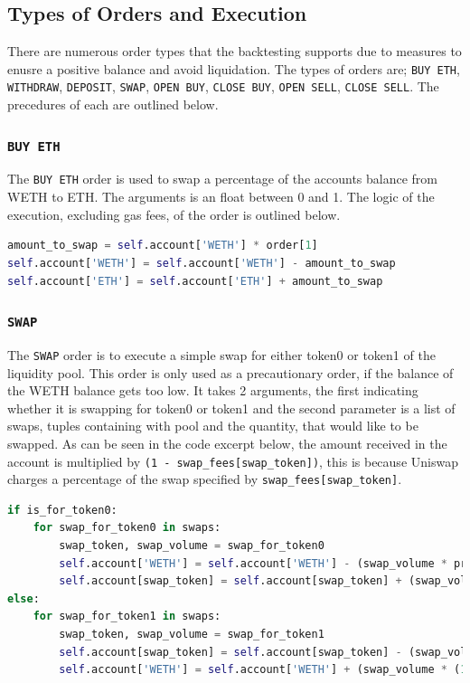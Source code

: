 \subsection{Types of Orders and Execution}
There are numerous order types that the backtesting supports due to measures to enusre a positive balance and avoid liquidation. The types of orders are; \texttt{BUY\ ETH}, \texttt{WITHDRAW}, \texttt{DEPOSIT}, \texttt{SWAP}, \texttt{OPEN\ BUY}, \texttt{CLOSE\ BUY}, \texttt{OPEN\ SELL}, \texttt{CLOSE\ SELL}. The precedures of each are outlined below.

\subsubsection{\texttt{BUY\ ETH}}
The \texttt{BUY\ ETH} order is used to swap a percentage of the accounts balance from WETH to ETH. The arguments is an float between 0 and 1. The logic of the execution, excluding gas fees, of the order is outlined below.
\vspace{5mm}
\begin{lstlisting}[language=Python]
amount_to_swap = self.account['WETH'] * order[1]
self.account['WETH'] = self.account['WETH'] - amount_to_swap
self.account['ETH'] = self.account['ETH'] + amount_to_swap
\end{lstlisting}

\subsubsection{\texttt{SWAP}}
The \texttt{SWAP} order is to execute a simple swap for either token0 or token1 of the liquidity pool. This order is only used as a precautionary order, if the balance of the WETH balance gets too low. It takes 2 arguments, the first indicating whether it is swapping for token0 or token1 and the second parameter is a list of swaps, tuples containing with pool and the quantity, that would like to be swapped. As can be seen in the code excerpt below, the amount received in the account is multiplied by \texttt{(1 - swap\_fees[swap\_token])}, this is because Uniswap charges a percentage of the swap specified by \texttt{swap\_fees[swap\_token]}.
\vspace{5mm}
\begin{lstlisting}[language=Python]
if is_for_token0:
    for swap_for_token0 in swaps:
        swap_token, swap_volume = swap_for_token0
        self.account['WETH'] = self.account['WETH'] - (swap_volume * prices[f'P{swap_token[1]}'])
        self.account[swap_token] = self.account[swap_token] + (swap_volume * (1 - swap_fees[swap_token]))
else:
    for swap_for_token1 in swaps:
        swap_token, swap_volume = swap_for_token1
        self.account[swap_token] = self.account[swap_token] - (swap_volume / prices[f'P{swap_token[1]}'])
        self.account['WETH'] = self.account['WETH'] + (swap_volume * (1 - swap_fees[swap_token]))
\end{lstlisting}

